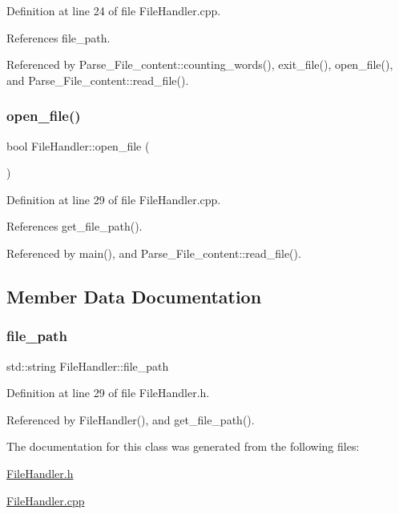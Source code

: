 Definition at line 24 of file File\+Handler.\+cpp.



References file\+\_\+path.



Referenced by Parse\+\_\+\+File\+\_\+content\+::counting\+\_\+words(), exit\+\_\+file(), open\+\_\+file(), and Parse\+\_\+\+File\+\_\+content\+::read\+\_\+file().

\mbox{\label{class_file_handler_aefc9976ff2b2788298a65eba6d6d27a2}} 
\subsubsection{\texorpdfstring{open\+\_\+file()}{open\_file()}}
{\footnotesize\ttfamily bool File\+Handler\+::open\+\_\+file (\begin{DoxyParamCaption}{ }\end{DoxyParamCaption})}



Definition at line 29 of file File\+Handler.\+cpp.



References get\+\_\+file\+\_\+path().



Referenced by main(), and Parse\+\_\+\+File\+\_\+content\+::read\+\_\+file().



\subsection{Member Data Documentation}
\mbox{\label{class_file_handler_a1683e00c3112530e697703c327e21c9b}} 
\subsubsection{\texorpdfstring{file\+\_\+path}{file\_path}}
{\footnotesize\ttfamily std\+::string File\+Handler\+::file\+\_\+path\hspace{0.3cm}{\ttfamily [private]}}



Definition at line 29 of file File\+Handler.\+h.



Referenced by File\+Handler(), and get\+\_\+file\+\_\+path().



The documentation for this class was generated from the following files\+:\begin{DoxyCompactItemize}
\item 
\mbox{\hyperlink{_file_handler_8h}{File\+Handler.\+h}}\item 
\mbox{\hyperlink{_file_handler_8cpp}{File\+Handler.\+cpp}}\end{DoxyCompactItemize}
